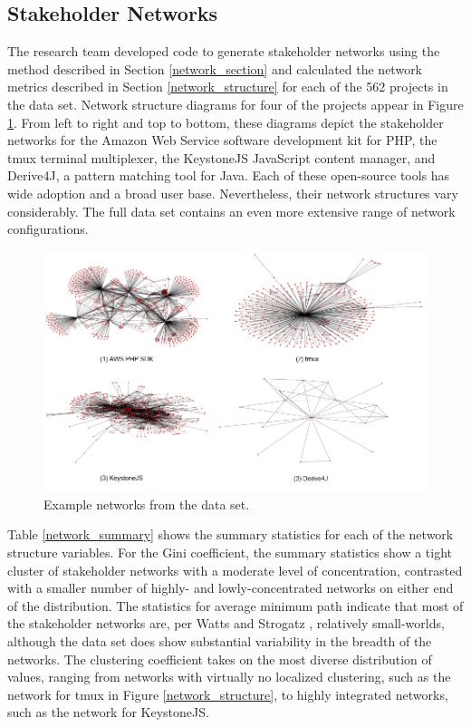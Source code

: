 \subsection{Stakeholder Networks}

The research team developed code to generate stakeholder networks using the method described in Section \ref{network_section} and calculated the network metrics described in Section \ref{network_structure} for each of the 562 projects in the data set. Network structure diagrams for four of the projects appear in Figure \ref{network_plots}. From left to right and top to bottom, these diagrams depict the stakeholder networks for the Amazon Web Service software development kit for PHP, the tmux terminal multiplexer, the KeystoneJS JavaScript content manager, and Derive4J, a pattern matching tool for Java. Each of these open-source tools has wide adoption and a broad user base. Nevertheless, their network structures vary considerably. The full data set contains an even more extensive range of network configurations.

\begin{figure}
  \includegraphics[width=.95\textwidth]{network_plots.PNG}
\caption{Example networks from the data set.}
\label{network_plots}
\end{figure}

Table \ref{network_summary} shows the summary statistics for each of the network structure variables. For the Gini coefficient, the summary statistics show a tight cluster of stakeholder networks with a moderate level of concentration, contrasted with a smaller number of highly- and lowly-concentrated networks on either end of the distribution. The statistics for average minimum path indicate that most of the stakeholder networks are, per Watts and Strogatz \cite{watts}, relatively small-worlds, although the data set does show substantial variability in the breadth of the networks. The clustering coefficient takes on the most diverse distribution of values, ranging from networks with virtually no localized clustering, such as the network for tmux in Figure \ref{network_structure}, to highly integrated networks, such as the network for KeystoneJS.

